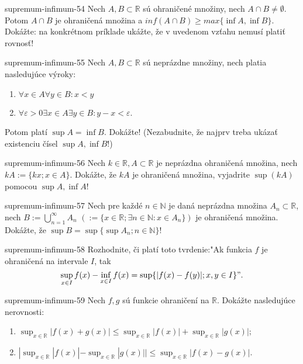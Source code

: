 \begin{defproblem}{supremum-infimum-54}
Nech $A,B\subset\mathbb{R}$ sú ohraničené množiny, nech $A\cap B\neq\emptyset$. Potom $A\cap B$ je ohraničená množina a $inf(A\cap B)\geq max \{\inf A,\inf B\}$. Dokážte: na konkrétnom príklade ukážte, že v uvedenom vzťahu nemusí platiť rovnosť!
\end{defproblem}

\begin{defproblem}{supremum-infimum-55}
Nech $A,B\subset\mathbb{R}$ sú neprázdne množiny, nech platia nasledujúce výroky:
\begin{enumerate}
\item $\forall x\in A \forall y\in B: x<y$
\item $\forall \varepsilon>0 \exists x\in A \exists y\in B:y-x<\varepsilon$.
\end{enumerate}
Potom platí $\sup A =\inf B$. Dokážte! (Nezabudnite, že najprv treba ukázať existenciu čísel $\sup A,\inf B$!)
\end{defproblem}

\begin{defproblem}{supremum-infimum-56}
Nech $k\in\mathbb{R},A\subset\mathbb{R}$ je neprázdna ohraničená množina, nech $kA:=\{kx;x\in A\}$. Dokážte, že $kA$ je ohraničená množina, vyjadrite $\sup (kA)$ pomocou $\sup A,\inf A$!
\end{defproblem}

\begin{defproblem}{supremum-infimum-57}
Nech pre každé $n\in\mathbb{N}$ je daná neprázdna množina $A_n\subset\mathbb{R}$, nech $B:=\bigcup_{n=1}^\infty A_n$ $(:=\{x\in\mathbb{R};\exists n\in\mathbb{N}:x\in A_n\})$ je ohraničená množina. Dokážte, že $\sup B= \sup\{\sup A_n;n\in\mathbb{N}\}$!
\end{defproblem}

\begin{defproblem}{supremum-infimum-58}
Rozhodnite, či platí toto tvrdenie:"Ak funkcia $f$ je ohraničená na intervale $I$, tak $$\sup_{x\in I}f(x)-\inf_{x\in I}f(x)=\sup \{|f(x)-f(y)|;x,y\in I\}".$$
\end{defproblem}

\begin{defproblem}{supremum-infimum-59}
Nech $f,g$ sú funkcie ohraničení na $\mathbb{R}$. Dokážte nasledujúce nerovnosti:
\begin{enumerate}
\item $\sup_{x\in\mathbb{R}}|f(x)+g(x)|\leq\sup_{x\in\mathbb{R}}|f(x)|+\sup_{x\in\mathbb{R}}|g(x)|;$
\item $|\sup_{x\in\mathbb{R}}|f(x)|-\sup_{x\in\mathbb{R}}|g(x)||\leq\sup_{x\in\mathbb{R}}|f(x)-g(x)|$.
\end{enumerate}
\end{defproblem}

